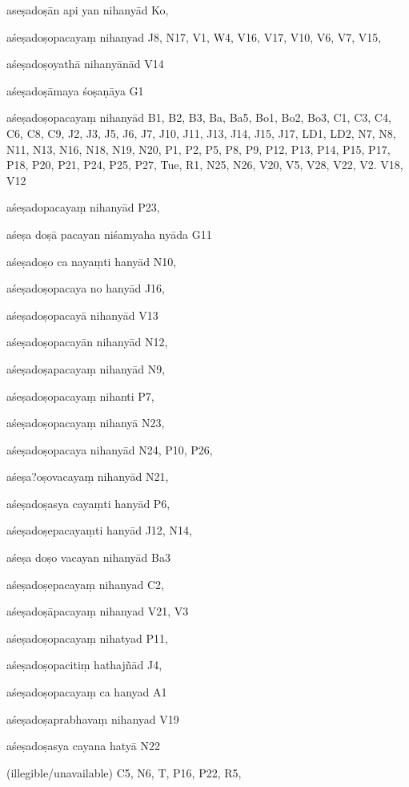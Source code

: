 \begin{ekdosis}
\begin{marma}[hp01_055]
\begin{marma}[hp02_009]
\begin{marma}[hp02_011]
 \begin{marma}[hp02_29c]
\item[aseṣadoṣān api yan nihanyād] Ko, 
\item[aśeṣadoṣopacayaṃ nihanyad] J8, N17, V1, W4, V16, V17, V10, V6, V7, V15, 
\item[aśeṣadoṣoyathā nihanyānād] V14
\item[aśeṣadoṣāmaya śoṣaṇāya] G1
\item[aśeṣadoṣopacayaṃ nihanyād] B1, B2, B3, Ba, Ba5, Bo1, Bo2, Bo3, C1, C3, C4, C6, C8, C9, J2, J3, J5, J6, J7, J10, J11, J13, J14, J15, J17, LD1, LD2, N7, N8, N11, N13, N16, N18, N19, N20, P1, P2, P5, P8, P9, P12, P13, P14, P15, P17, P18, P20, P21, P24, P25, P27, Tue, R1, N25, N26, V20, V5, V28, V22, V2. V18, V12
\item[aśeṣadopacayaṃ nihanyād] P23,
\item[aśeṣa doṣā pacayan niśamyaha nyāda] G11
\item[aśeṣadoṣo ca nayaṃti hanyād] N10,
\item[aśeṣadoṣopacaya no hanyād] J16,
\item[aśeṣadoṣopacayā nihanyād] V13
\item[aśeṣadoṣopacayān nihanyād] N12,
\item[aśeṣadoṣapacayaṃ nihanyād] N9,
\item[aśeṣadoṣopacayaṃ nihanti] P7, 
\item[aśeṣadoṣopacayaṃ nihanyā] N23,
\item[aśeṣadoṣopacaya nihanyād] N24, P10, P26, 
\item[aśeṣa?oṣovacayaṃ nihanyād] N21,
\item[aśeṣadoṣasya cayaṃti hanyād] P6,
\item[aśeṣadoṣepacayaṃti hanyād] J12, N14, 
\item[aśeṣa doṣo vacayan nihanyād] Ba3
\item[aśeṣadoṣepacayaṃ nihanyad] C2,
\item[aśeṣadoṣāpacayaṃ nihanyad] V21, V3
\item[aśeṣadoṣopacayaṃ nihatyad] P11, 
\item[aśeṣadoṣopacitiṃ hathajñād] J4,
\item[aśeṣadoṣopacayaṃ ca hanyad] A1
\item[aśeṣadoṣaprabhavaṃ nihanyad] V19
\item[aśeṣadoṣasya cayana hatyā] N22
\item[(illegible/unavailable)] C5, N6, T, P16, P22, R5,
  \begin{description}


\end{description}
\end{marma}
\end{marma}
\end{marma}
\end{marma}
\end{ekdosis}
